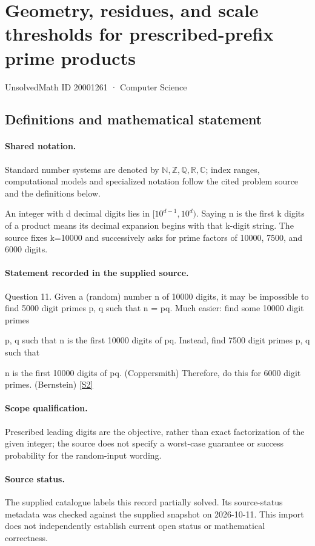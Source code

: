 \documentclass[11pt]{article}
\newcommand{\sref}[2]{\hyperlink{source:#1:#2}{[S#2]}}
\begin{document}
\setcounter{section}{20001260}
\section{Geometry, residues, and scale thresholds for prescribed-prefix prime products}\label{20001261}
{\small\sffamily UnsolvedMath ID 20001261 · Computer Science}
\subsection{Definitions and mathematical statement}

\paragraph{Shared notation.}Standard number systems are denoted by $\mathbb N,\mathbb Z,\mathbb Q,\mathbb R,\mathbb C$; index ranges, computational models and specialized notation follow the cited problem source and the definitions below.


An integer with d decimal digits lies in $[10^{d-1},10^d)$. Saying n is the first k digits of a product means its decimal expansion begins with that k-digit string. The source fixes k=10000 and successively asks for prime factors of 10000, 7500, and 6000 digits.
\paragraph{Statement recorded in the supplied source.}
Question 11. Given a (random) number n of 10000 digits, it may be impossible to find 5000 digit primes p, q such that n = pq. Much easier: find some 10000 digit primes

p, q such that n is the first 10000 digits of pq. Instead, find 7500 digit primes p, q such that

n is the first 10000 digits of pq. (Coppersmith) Therefore, do this for 6000 digit primes. (Bernstein) \sref{20001261}{2}
\paragraph{Scope qualification.}
Prescribed leading digits are the objective, rather than exact factorization of the given integer; the source does not specify a worst-case guarantee or success probability for the random-input wording.
\paragraph{Source status.}
The supplied catalogue labels this record partially solved. Its source-status metadata was checked against the supplied snapshot on 2026-10-11. This import does not independently establish current open status or mathematical correctness.
\end{document}
